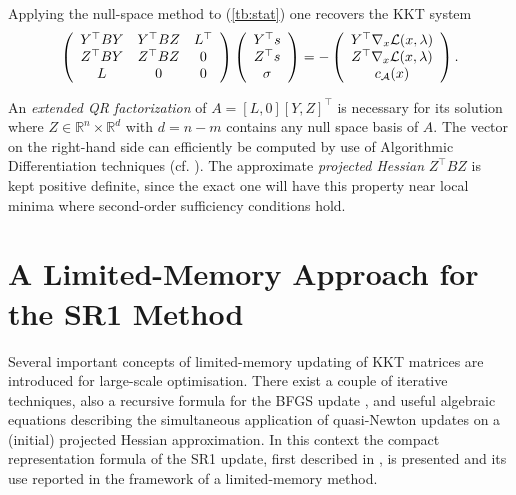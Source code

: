 \documentclass{svmult}
\begin{document}
\noindent Applying the null-space method to (\ref{tb:stat}) one recovers the KKT system
\begin{equation*}
	\left( \begin{array}{c c c} Y^{\top}BY & Y^{\top}BZ &L^{\top}\\
		Z^{\top}BY & Z^{\top}BZ &0\\
	L&0&0 \end{array}\right)
	\left( \begin{array}{c} Y^{\top}s \\ Z^{\top}s \\ \sigma \end{array}\right)
	= - \left( \begin{array}{c} Y^{\top}\nabla_x \mathcal{L}(x,\lambda) \\ Z^{\top}\nabla_x \mathcal{L}(x,\lambda) \\c_{\mathcal{A}}(x)\end{array}\right) .
\end{equation*}

\noindent An \textit{extended QR factorization} of $A=[L,0][Y, Z]^{\top}$ is necessary for its solution where  $Z \in \mathbb{R}^n\times \mathbb{R}^d$ with $d=n-m$ contains any null space basis of $A$.  The vector on the right-hand side can efficiently be computed by use of Algorithmic Differentiation techniques (cf. \cite{tb:AD}).
The approximate \textit{projected Hessian} $Z^{\top}BZ$ is kept positive definite, since the exact one will have this property near local minima where second-order sufficiency conditions hold.


\clearpage
\section{A Limited-Memory Approach for the SR1 Method}

Several important concepts of limited-memory updating of KKT matrices are introduced for large-scale optimisation. 
There exist a couple of iterative techniques, also a recursive formula for the
BFGS update \cite{NW}, and useful algebraic equations
describing the simultaneous application of quasi-Newton updates on a (initial) projected Hessian approximation. 
In this context the compact representation
formula of the SR1 update, first described in \cite{tb:NOCEDAL}, is presented and its use reported in the framework of 
a limited-memory method. \\
\end{document}
